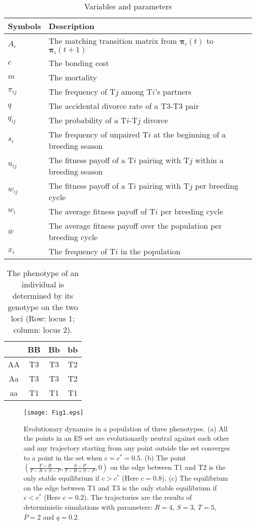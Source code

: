 \documentclass[12pt]{article}
\begin{document}
\clearpage
\begin{table*}
		\centering
		\caption{Variables and parameters}
		\begin{tabular}[htb]{ll} \hline
		Symbols	& Description \\ \hline
		$A_i$		& The matching transition matrix from $\mathbf{\pi}_i(t)$ to $\mathbf{\pi}_i(t+1)$\\
		$c$			& The bonding cost \\
		$m$			& The mortality \\		
		$\pi_{ij}$  & The frequency of T$j$ among T$i$'s partners\\
		$q$			& The accidental divorce rate of a T3-T3 pair\\
		$q_{ij}$	& The probability of a T$i$-T$j$ divorce\\
		$s_i$		& The frequency of unpaired T$i$ at the beginning of a breeding season\\
		$u_{ij}$	& The fitness payoff of a T$i$ pairing with T$j$ within a breeding season \\
		$w_{ij}$	& The fitness payoff of a T$i$ pairing with T$j$ per breeding cycle \\
		$w_{i}$		& The average fitness payoff of T$i$ per breeding cycle\\
		$\bar{w}$	& The average fitness payoff over the population per breeding cycle\\
		$x_i$		& The frequency of T$i$ in the population\\
		\hline
		\end{tabular}
		\label{tab:VariablesAndParameters}
\end{table*}

\clearpage
\begin{table*}
		\centering
		\caption{The phenotype of an individual is determined by its genotype on the two loci (Row: locus 1; column: locus 2).}
		\begin{tabular}[htb]{cccc} \hline
		  & BB & Bb & bb \\ \hline
		AA & T3 & T3 & T2 \\
		Aa & T3 & T3 & T2 \\
		aa & T1 & T1 & T1 \\
		\hline
		\end{tabular}
		\label{tab:geno-pheno}
\end{table*}


\clearpage

\begin{figure}
	\centering
	\texttt{[image: Fig1.eps]}
  \caption{Evolutionary dynamics in a population of three phenotypes. (a) All the points in an ES set are evolutionarily neutral against each other and any trajectory starting from any point outside the set converges to a point in the set when $c=c^*=0.5$. (b) The point $(\frac{T-R}{T-R+S-P},\frac{S-P}{T-R+S-P},0)$ on the edge between T1 and T2 is the only stable equilibrium if $c>c^*$ (Here $c=0.8$). (c) The equilibrium on the edge between T1 and T3 is the only stable equilibrium if $c<c^*$ (Here $c=0.2$). The trajectories are the results of deterministic simulations with parameters: $R=4$, $S=3$, $T=5$, $P=2$ and $q=0.2$.}
  \label{fig:coexisteqm}
\end{figure}
\end{document}
